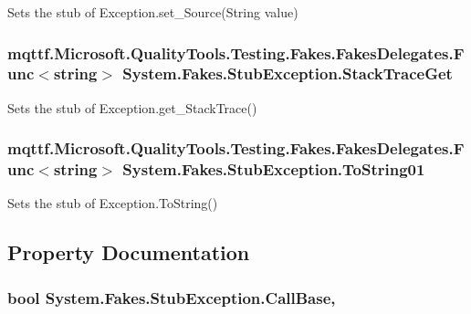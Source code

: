 Sets the stub of Exception.\-set\-\_\-\-Source(\-String value)

\hypertarget{class_system_1_1_fakes_1_1_stub_exception_aa4ed39201b82f3da19be942dc3a89b6a}{
\subsubsection[{Stack\-Trace\-Get}]{\setlength{\rightskip}{0pt plus 5cm}mqttf.\-Microsoft.\-Quality\-Tools.\-Testing.\-Fakes.\-Fakes\-Delegates.\-Func$<$string$>$ System.\-Fakes.\-Stub\-Exception.\-Stack\-Trace\-Get}}\label{class_system_1_1_fakes_1_1_stub_exception_aa4ed39201b82f3da19be942dc3a89b6a}


Sets the stub of Exception.\-get\-\_\-\-Stack\-Trace()

\hypertarget{class_system_1_1_fakes_1_1_stub_exception_a87e1939c323cec8e82e04c1b5682fc0c}{
\subsubsection[{To\-String01}]{\setlength{\rightskip}{0pt plus 5cm}mqttf.\-Microsoft.\-Quality\-Tools.\-Testing.\-Fakes.\-Fakes\-Delegates.\-Func$<$string$>$ System.\-Fakes.\-Stub\-Exception.\-To\-String01}}\label{class_system_1_1_fakes_1_1_stub_exception_a87e1939c323cec8e82e04c1b5682fc0c}


Sets the stub of Exception.\-To\-String()



\subsection{Property Documentation}
\hypertarget{class_system_1_1_fakes_1_1_stub_exception_aad290d7b712ab9a237e5e899e9c2c18f}{
\subsubsection[{Call\-Base}]{\setlength{\rightskip}{0pt plus 5cm}bool System.\-Fakes.\-Stub\-Exception.\-Call\-Base\hspace{0.3cm}{\ttfamily [get]}, {\ttfamily [set]}}}\label{class_system_1_1_fakes_1_1_stub_exception_aad290d7b712ab9a237e5e899e9c2c18f}


